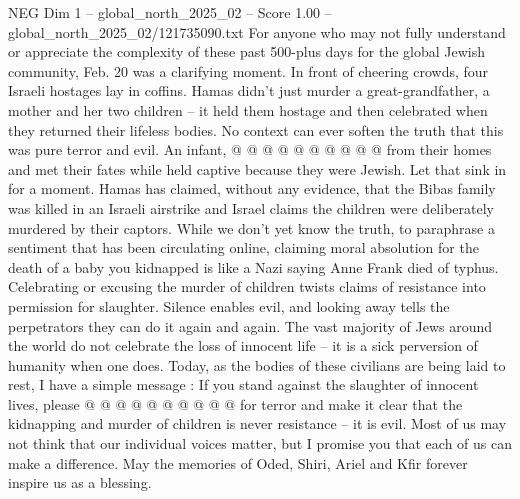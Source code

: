 \begin{textsample}{NEG Dim 1 – global\_north\_2025\_02 – Score 1.00 – global\_north\_2025\_02/121735090.txt}
For anyone who may not fully understand or appreciate the complexity of these past 500-plus days for the global Jewish community, Feb. 20 was a clarifying moment.
In front of cheering crowds, four Israeli hostages lay in coffins.
Hamas didn't just murder a great-grandfather, a mother and her two children -- it held them hostage and then celebrated when they returned their lifeless bodies.
No context can ever soften the truth that this was pure terror and evil.
An infant, @ @ @ @ @ @ @ @ @ @ from their homes and met their fates while held captive because they were Jewish.
Let that sink in for a moment.
Hamas has claimed, without any evidence, that the Bibas family was killed in an Israeli airstrike and Israel claims the children were deliberately murdered by their captors.
While we don't yet know the truth, to paraphrase a sentiment that has been circulating online, claiming moral absolution for the death of a baby you kidnapped is like a Nazi saying Anne Frank died of typhus.
Celebrating or excusing the murder of children twists claims of resistance into permission for slaughter.
Silence enables evil, and looking away tells the perpetrators they can do it again and again.
The vast majority of Jews around the world do not celebrate the loss of innocent life -- it is a sick perversion of humanity when one does.
Today, as the bodies of these civilians are being laid to rest, I have a simple message : If you stand against the slaughter of innocent lives, please @ @ @ @ @ @ @ @ @ @ for terror and make it clear that the kidnapping and murder of children is never resistance -- it is evil.
Most of us may not think that our individual voices matter, but I promise you that each of us can make a difference.
May the memories of Oded, Shiri, Ariel and Kfir forever inspire us as a blessing.

\end{textsample}
